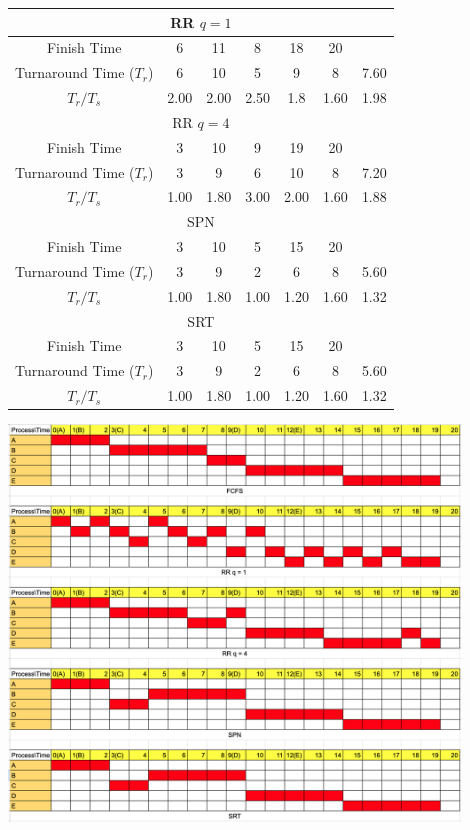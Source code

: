 \documentclass[12pt]{article}
\newenvironment{sol}[1][Solution]{\begin{trivlist}\item[\hskip\labelsep {\bfseries #1:}]}{\end{trivlist}}
\begin{document}
\begin{enumerate}
\begin{sol}
\begin{center}
\begin{tabular}{|c|c|c|c|c|c|c|}
        \multicolumn{7}{|c|}{RR $q = 1$}\\
        \hline 
        Finish Time & 6 & 11 & 8 & 18 & 20 & \\
        \hline
         Turnaround Time ($T_r$) & 6 & 10 & 5 & 9 & 8 & 7.60\\ 
        \hline
         $T_r / T_s$ & 2.00 & 2.00 & 2.50 & 1.8 & 1.60 & 1.98 \\
                  \hline


        \multicolumn{7}{|c|}{RR $q = 4$}\\
        \hline 
        Finish Time & 3 & 10 & 9 & 19 & 20 & \\
        \hline
         Turnaround Time ($T_r$) & 3 & 9 & 6 & 10 & 8 & 7.20\\ 
        \hline
         $T_r / T_s$ & 1.00 & 1.80 & 3.00 & 2.00 & 1.60 & 1.88 \\
                  \hline
                  
        \multicolumn{7}{|c|}{SPN}\\
        \hline 
        Finish Time & 3 & 10 & 5 & 15 & 20 & \\
        \hline
         Turnaround Time ($T_r$) & 3 & 9 & 2 & 6 & 8 & 5.60\\ 
        \hline
         $T_r / T_s$ & 1.00 & 1.80 & 1.00 & 1.20 & 1.60 & 1.32 \\
                  \hline
                  
        \multicolumn{7}{|c|}{SRT}\\
        \hline 
        Finish Time & 3 & 10 & 5 & 15 & 20 & \\
        \hline
         Turnaround Time ($T_r$) & 3 & 9 & 2 & 6 & 8 & 5.60\\ 
        \hline
         $T_r / T_s$ & 1.00 & 1.80 & 1.00 & 1.20 & 1.60 & 1.32 \\
                  \hline
        
    \end{tabular}
        \includegraphics[width=0.9\textwidth]{4.png}


\end{center}
\end{sol}
\end{enumerate}
\end{document}
